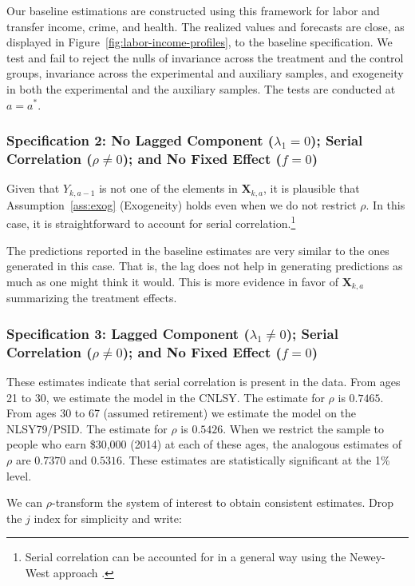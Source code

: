 Our baseline estimations are constructed using this framework for labor and transfer income, crime, and health. The realized values and forecasts are close, as displayed in Figure~\ref{fig:labor-income-profiles}, to the baseline specification. We test and fail to reject the nulls of invariance across the treatment and the control groups, invariance across the experimental and auxiliary samples, and exogeneity in both the experimental and the auxiliary samples.  The tests are conducted at $a = a^*$.

\subsubsection{Specification 2: No Lagged Component ($\lambda_{1} = 0$); Serial Correlation ($\rho \neq 0$); and No Fixed Effect ($f = 0$)} \label{app:spec2}

Given that $Y_{k,a-1}$ is not one of the elements in $\bm{X}_{k,a}$, it is plausible that Assumption~\ref{ass:exog} (Exogeneity) holds even when we do not restrict $\rho$. In this case, it is straightforward to account for serial correlation.\footnote{Serial correlation can be accounted for in a general way using the Newey-West approach \citep{Newey-West_1986_Simple-Pos}.}

The predictions reported in the baseline estimates are very similar to the ones generated in this case. That is, the lag does not help in generating predictions as much as one might think it would. This is more evidence in favor of $\bm{X}_{k,a}$ summarizing the treatment effects.

\subsubsection{Specification 3: Lagged Component ($\lambda_{1} \neq 0$); Serial Correlation ($\rho \neq 0$); and No Fixed Effect ($f = 0$)} \label{section:laggedserial}

These estimates indicate that serial correlation is present in the data. From ages 21 to 30, we estimate the model in the CNLSY. The estimate for $\rho$ is $0.7465$. From ages 30 to 67 (assumed retirement) we estimate the model on the NLSY79/PSID. The estimate for $\rho$ is $0.5426$. When we restrict the sample to people who earn \$30,000 (2014) at each of these ages, the analogous estimates of $\rho$ are $0.7370$ and $0.5316$. These estimates are statistically significant at the 1\% level.

We can $\rho$-transform the system of interest to obtain consistent estimates. Drop the $j$ index for simplicity and write:

